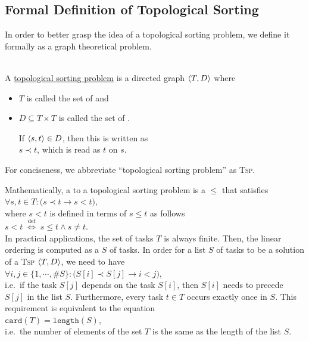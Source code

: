 \subsection{Formal Definition of Topological Sorting}
In order to better grasp the idea of a topological sorting problem, we define it formally as a graph
theoretical problem.
\begin{Definition}  \hspace*{\fill} \\
  A \href{https://en.wikipedia.org/wiki/Topological_sorting}{topological sorting problem} is a directed graph
  $\pair(T, D)$ where
  \begin{itemize}
  \item $T$ is called the set of  and 
  \item $D \subseteq T \times T$ is called the set of .

        If $\pair(s, t) \in D$, then this is written as 
        \\[0.2cm]
        \hspace*{1.3cm}
        $s \prec t$, \quad which is read as $t$  on $s$.
  \end{itemize}
  For conciseness, we abbreviate ``topological sorting problem'' as \textsc{Tsp}.
  
  Mathematically, a  to a topological sorting problem is a  $\leq$ that
  satisfies 
  \\[0.2cm]
  \hspace*{1.3cm}
  $\forall s, t \in T:\bigl(s \prec t \rightarrow s < t\bigr)$,
  \\[0.2cm]
  where $s < t$ is defined in terms of $s \leq t$ as follows
  \\[0.2cm]
  \hspace*{1.3cm}
  $s < t \;\stackrel{\mathrm{def}}{\Longleftrightarrow}\; s \leq t \wedge s \not= t$.
  \\[0.2cm]
  In practical applications, the set of tasks $T$ is always finite.  Then, the linear ordering is computed as a 
  $S$ of tasks.  In order for a list $S$ of tasks to be a solution of a \textsc{Tsp} $\pair(T,D)$, we need to have 
  \\[0.2cm]
  \hspace*{1.3cm}
  $\forall i,j \in \{1,\cdots,\#S\}:\bigl(S[i] \prec S[j] \rightarrow i < j\bigr)$,
  \\[0.2cm]
  i.e.~if the task $S[j]$ depends on the task $S[i]$, then $S[i]$ needs to precede $S[j]$ in the list $S$.
  Furthermore, every task $t \in T$ occurs exactly once in $S$. This requirement is equivalent to the equation
  \\[0.2cm]
  \hspace*{1.3cm}
  $\texttt{card}(T) = \texttt{length}(S)$,
  \\[0.2cm]
  i.e.~the number of elements of the set $T$ is the same as the length of the list $S$.
  \eox
\end{Definition}

